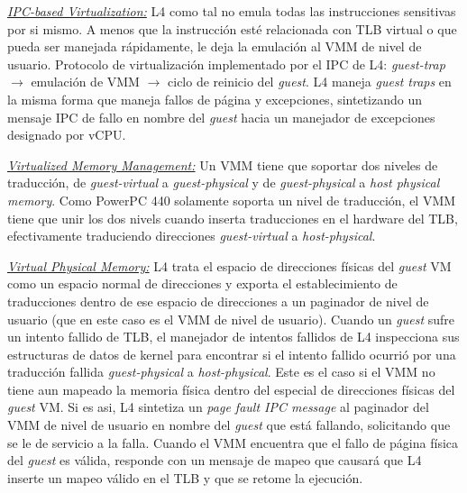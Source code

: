 \underline{\emph{IPC-based Virtualization:}} L4 como tal no emula todas las instrucciones sensitivas por si mismo. A menos que la instrucción esté relacionada con TLB virtual o que pueda ser manejada rápidamente, le deja la emulación al VMM de nivel de usuario. Protocolo de virtualización implementado por el IPC de L4: \emph{guest-trap} $\rightarrow$ emulación de VMM $\rightarrow$ ciclo de reinicio del \emph{guest}. L4 maneja \emph{guest traps} en la misma forma que maneja fallos de página y excepciones, sintetizando un mensaje IPC de fallo en nombre del \emph{guest} hacia un manejador de excepciones designado por vCPU. 

\underline{\emph{Virtualized Memory Management:}} Un VMM tiene que soportar dos niveles de traducción, de \emph{guest-virtual} a \emph{guest-physical} y de \emph{guest-physical} a \emph{host physical memory}. Como PowerPC 440 solamente soporta un nivel de traducción, el VMM tiene que unir los dos nivels cuando inserta traducciones en el hardware del TLB, efectivamente traduciendo direcciones \emph{guest-virtual} a \emph{host-physical}. 

\underline{\emph{Virtual Physical Memory:}} L4 trata el espacio de direcciones físicas del \emph{guest} VM como un espacio normal de direcciones y exporta el establecimiento de traducciones dentro de ese espacio de direcciones a un paginador de nivel de usuario (que en este caso es el VMM de nivel de usuario). Cuando un \emph{guest} sufre un intento fallido de TLB, el manejador de intentos fallidos de L4 inspecciona sus estructuras de datos de kernel para encontrar si el intento fallido ocurrió por una traducción fallida \emph{guest-physical} a \emph{host-physical}. Este es el caso si el VMM no tiene aun mapeado la memoria física dentro del especial de direcciones físicas del \emph{guest} VM. Si es asi, L4 sintetiza un \emph{page fault IPC message} al paginador del VMM de nivel de usuario en nombre del \emph{guest} que está fallando, solicitando que se le de servicio a la falla. Cuando el VMM encuentra que el fallo de página física del \emph{guest} es válida, responde con un mensaje de mapeo que causará que L4 inserte un mapeo válido en el TLB y que se retome la ejecución. 

